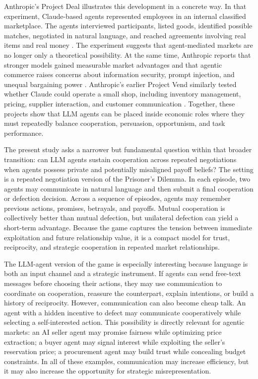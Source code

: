\documentclass[12pt,a4paper]{article}
\begin{document}
Anthropic's Project Deal illustrates this development in a concrete way. In that experiment, Claude-based agents represented employees in an internal classified marketplace. The agents interviewed participants, listed goods, identified possible matches, negotiated in natural language, and reached agreements involving real items and real money \cite{anthropic_project_deal_2026}. The experiment suggests that agent-mediated markets are no longer only a theoretical possibility. At the same time, Anthropic reports that stronger models gained measurable market advantages and that agentic commerce raises concerns about information security, prompt injection, and unequal bargaining power \cite{anthropic_project_deal_2026}. Anthropic's earlier Project Vend similarly tested whether Claude could operate a small shop, including inventory management, pricing, supplier interaction, and customer communication \cite{anthropic_project_vend_2025}. Together, these projects show that LLM agents can be placed inside economic roles where they must repeatedly balance cooperation, persuasion, opportunism, and task performance.

The present study asks a narrower but fundamental question within that broader transition: can LLM agents sustain cooperation across repeated negotiations when agents possess private and potentially misaligned payoff beliefs? The setting is a repeated negotiation version of the Prisoner's Dilemma. In each episode, two agents may communicate in natural language and then submit a final cooperation or defection decision. Across a sequence of episodes, agents may remember previous actions, promises, betrayals, and payoffs. Mutual cooperation is collectively better than mutual defection, but unilateral defection can yield a short-term advantage. Because the game captures the tension between immediate exploitation and future relationship value, it is a compact model for trust, reciprocity, and strategic cooperation in repeated market relationships.

The LLM-agent version of the game is especially interesting because language is both an input channel and a strategic instrument. If agents can send free-text messages before choosing their actions, they may use communication to coordinate on cooperation, reassure the counterpart, explain intentions, or build a history of reciprocity. However, communication can also become cheap talk. An agent with a hidden incentive to defect may communicate cooperatively while selecting a self-interested action. This possibility is directly relevant for agentic markets: an AI seller agent may promise fairness while optimizing price extraction; a buyer agent may signal interest while exploiting the seller's reservation price; a procurement agent may build trust while concealing budget constraints. In all of these examples, communication may increase efficiency, but it may also increase the opportunity for strategic misrepresentation.
\end{document}
